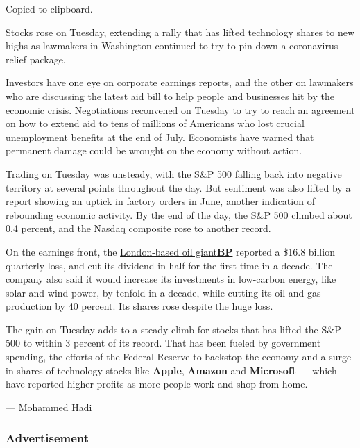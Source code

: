 Copied to clipboard.

Stocks rose on Tuesday, extending a rally that has lifted technology
shares to new highs as lawmakers in Washington continued to try to pin
down a coronavirus relief package.

Investors have one eye on corporate earnings reports, and the other on
lawmakers who are discussing the latest aid bill to help people and
businesses hit by the economic crisis. Negotiations reconvened on
Tuesday to try to reach an agreement on how to extend aid to tens of
millions of Americans who lost crucial
\href{https://www.nytimes.com/2020/07/30/business/unemployment-payments-change.html}{unemployment
benefits} at the end of July. Economists have warned that permanent
damage could be wrought on the economy without action.

Trading on Tuesday was unsteady, with the S\&P 500 falling back into
negative territory at several points throughout the day. But sentiment
was also lifted by a report showing an uptick in factory orders in June,
another indication of rebounding economic activity. By the end of the
day, the S\&P 500 climbed about 0.4 percent, and the Nasdaq composite
rose to another record.

On the earnings front, the
\href{https://www.nytimes.com/live/2020/08/04/business/stock-market-today-coronavirus/bp-to-step-up-renewable-investment-as-it-reports-a-huge-loss}{London-based
oil
giant}\textbf{\href{https://www.nytimes.com/live/2020/08/04/business/stock-market-today-coronavirus/bp-to-step-up-renewable-investment-as-it-reports-a-huge-loss}{BP}}
reported a \$16.8 billion quarterly loss, and cut its dividend in half
for the first time in a decade. The company also said it would increase
its investments in low-carbon energy, like solar and wind power, by
tenfold in a decade, while cutting its oil and gas production by 40
percent. Its shares rose despite the huge loss.

The gain on Tuesday adds to a steady climb for stocks that has lifted
the S\&P 500 to within 3 percent of its record. That has been fueled by
government spending, the efforts of the Federal Reserve to backstop the
economy and a surge in shares of technology stocks like \textbf{Apple},
\textbf{Amazon} and \textbf{Microsoft} --- which have reported higher
profits as more people work and shop from home.

--- Mohammed Hadi

\hypertarget{advertisement-2}{%
\subsubsection{Advertisement}\label{advertisement-2}}

